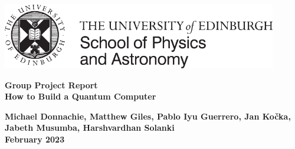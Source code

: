 \documentclass[12pt]{article}
\begin{document}





\pagestyle{empty}                       %

\par\noindent\includegraphics[width=12cm]{images/PandA_crest.pdf}

\par\noindent                                           %
\vspace*{2cm}
\begin{center}
        \Large\bf \Large\bf Group Project Report\\
        \LARGE\bf How to Build a Quantum Computer
        
\end{center}
\vspace*{0.5cm}
\begin{center}
        \bf Michael Donnachie, Matthew Giles, Pablo Iyu Guerrero, Jan Ko\v{c}ka, Jabeth Musumba, Harshvardhan Solanki
\\                               
        February 2023                              %
\end{center}
\vspace*{5mm}
%
\end{document}
